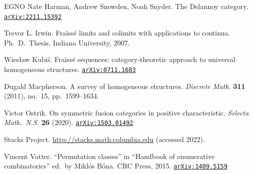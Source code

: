 \documentclass[12pt]{amsart}
\numberwithin{equation}{section}
\theoremstyle{definition}
\newcommand{\arxiv}[1]{\href{http://arxiv.org/abs/#1}{{\tiny\tt arXiv:#1}}}
\newcommand{\DOI}[1]{\href{http://doi.org/#1}{\color{purple}{\tiny\tt DOI:#1}}}
\begin{document}
\begin{thebibliography}{EGNO}
 Nate Harman, Andrew Snowden, Noah Snyder. The Delannoy category. \arxiv{2211.15392}

 Trevor L. Irwin. Fra\"iss\'e limits and colimits with applications to continua. Ph.\ D.~Thesis, Indiana University, 2007.



 Wies\l{}aw Kubi\'s. Fra\"iss\'e sequences: category-theoretic approach to universal homogeneous structures. \arxiv{0711.1683}

 Dugald Macpherson. A survey of homogeneous structures. \textit{Discrete Math.} \textbf{311} (2011), no.~15, pp.~1599--1634. \DOI{10.1016/j.disc.2011.01.024}

 Victor Ostrik. On symmetric fusion categories in positive characteristic. \textit{Selecta Math.\ N.S.} \textbf{26} (2020). \DOI{10.1007/s00029-020-00567-5} \arxiv{1503.01492}

 Stacks Project. {\tiny\url{http://stacks.math.columbia.edu}} (accessed 2022).

 Vincent Vatter. ``Permutation classes'' in ``Handbook of enumerative combinatorics'' ed.\ by Mikl\'os B\'ona. CRC Press, 2015. \arxiv{1409.5159}

\end{thebibliography}
\end{document}
